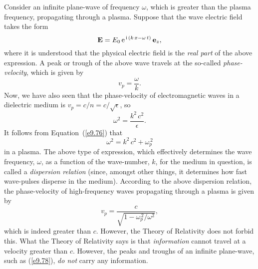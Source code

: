 Consider an infinite plane-wave of frequency $\omega$, which is greater than
the plasma frequency, propagating through a plasma. Suppose that
the wave electric field takes the form
\begin{equation}\label{e9.78}
{\bf E} = E_0\,{\rm e}^{\,{\rm i}\,(k\,x-\omega\,t)}\,{\bf e}_z,
\end{equation}
where it is understood that the physical electric field is the {\em real
part}\/ of the above expression.  A peak or trough of the above wave
travels at the so-called {\em phase-velocity}, which is given by
\begin{equation}\label{e9.79}
v_p = \frac{\omega}{k}. 
\end{equation}
Now, we have also seen that the phase-velocity of electromagnetic waves
in a dielectric medium is $v_p = c/n=c/\sqrt{\epsilon}$, so
\begin{equation}\label{e9.80a}
\omega^2 = \frac{k^2\,c^2}{\epsilon}.
\end{equation}
It follows from Equation~(\ref{e9.76})  that
\begin{equation}\label{e9.80}
\omega^2 = k^2\,c^2+\omega_p^{\,2}
\end{equation}
in a plasma. The above type of expression, which effectively determines the wave
frequency, $\omega$, as a function of the wave-number, $k$, for the
medium in question, is called a {\em dispersion relation} (since,
amongst other things, it determines how fast wave-pulses disperse in
the medium). According to the above dispersion relation, the phase-velocity
of high-frequency waves propagating through a plasma is given by
\begin{equation}\label{e9.81}
v_p = \frac{c}{\sqrt{1-\omega_p^{\,2}/\omega^{2}}},
\end{equation}
which is indeed greater than $c$. However, the Theory of Relativity does not
forbid this. What the Theory of Relativity says is that {\em information}\/
cannot travel at a velocity greater than $c$. However, the peaks and
troughs of an infinite
plane-wave, such as (\ref{e9.78}), {\em do not}\/ carry any information.

